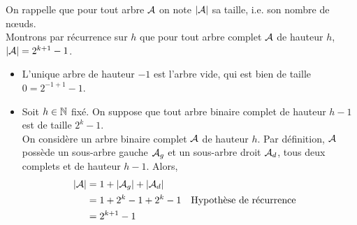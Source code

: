 \begin{demonstration}
    On rappelle que pour tout arbre $\mathcal{A}$ on note $|\mathcal{A}|$ sa taille, i.e. son nombre de nœuds. \\ Montrons par récurrence sur $h$ que pour tout arbre complet $\mathcal{A}$ de hauteur $h$, $|\mathcal{A}| = 2^{k+1} - 1$. \begin{itemize}
        \item L'unique arbre de hauteur $-1$ est l'arbre vide, qui est bien de taille $0 = 2^{-1+1} - 1$.
        \item Soit $h \in \mathbb{N}$ fixé. On suppose que tout arbre binaire complet de hauteur $h-1$ est de taille $2^k - 1$. \\ On considère un arbre binaire complet $\mathcal{A}$ de hauteur $h$. Par définition, $\mathcal{A}$ possède un sous-arbre gauche $\mathcal{A}_g$ et un sous-arbre droit $\mathcal{A}_d$, tous deux complets et de hauteur $h-1$. Alors, \begin{align*}
            |\mathcal{A}| &= 1 + |\mathcal{A}_g| + |\mathcal{A}_d| \\
            &= 1 + 2^k -1 + 2^k - 1 &&\text{Hypothèse de récurrence} \\
            &= 2^{k+1} - 1
        \end{align*}
    \end{itemize}
\end{demonstration}


